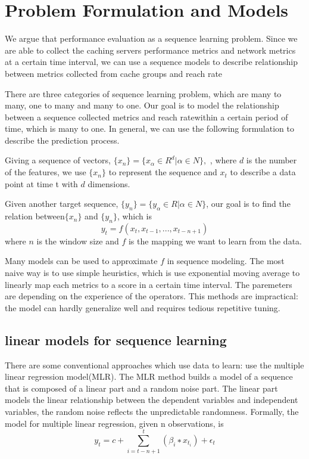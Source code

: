 \documentclass[5p]{elsarticle}
\newcommand{\dabiaolv}{reach rate}
\begin{document}
\section{Problem Formulation and Models}
We argue that performance evaluation as a sequence learning problem. Since we are able to collect the caching servers performance metrics and network metrics at a certain time interval, we can use a sequence models to describe relationship between metrics collected from  cache groups and \dabiaolv

There are three categories of sequence learning problem, which are many to many, one to many and many to one. Our goal is to model the relationship between a sequence collected metrics and \dabiaolv within a certain period of time, which is many to one. In general, we can use the following formulation to describe the prediction process.

Giving a sequence of vectors, $\{x_n\}=\{x_{\alpha} \in R^{d}|\alpha \in N\}, $ , where $d$ is the number of the features, we use $\{x_n\}$ to represent the sequence and $x_t$ to describe a data point at time t with $d$ dimensions.

Given another target sequence, $\{y_n\}=\{y_{\alpha} \in R|\alpha \in N\}$, our goal is to find the relation between$\{x_n\}$ and $\{y_n\}$, which is 
$$y_t=f(x_{t},x_{t-1},...,x_{t-n+1})$$
where $n$ is the window size and $f$ is the mapping we want to learn from the data.

Many models can be used to approximate $f$ in sequence modeling. The most naive way is to use simple heuristics, which is use exponential moving average to linearly map each metrics to a score in a certain time interval. The paremeters are depending on the experience of the operators. This methods are impractical: the model can hardly generalize well and requires tedious repetitive tuning.

\subsection{linear models for sequence learning}

There are some conventional approaches which use data to learn: use the multiple linear regression model(MLR). The MLR method builds a model of a sequence that is composed of a linear part and a random noise part. The linear part models the linear relationship between the dependent variables and independent variables, the random noise reflects the unpredictable randomness. Formally, the model for multiple linear regression, given n observations, is 
    $$y_t = c+\sum_{i=t-n+1}^{t}(\beta_i ∗ x_{t_i})+\epsilon_t$$
\end{document}
